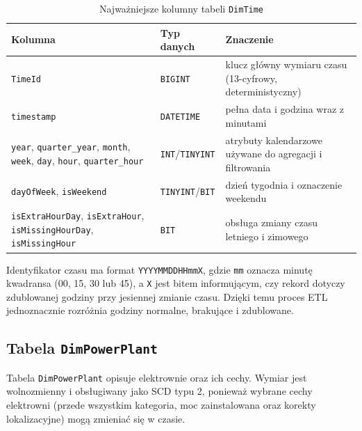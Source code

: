 \documentclass[12pt]{article}
\begin{document}
	\begin{table}[h!]
		\centering
		\small
		\begin{tabularx}{\textwidth}{|p{3.3cm}|p{2.6cm}|X|}
			\hline
			\textbf{Kolumna} & \textbf{Typ danych} & \textbf{Znaczenie} \\
			\hline
			\texttt{TimeId} & \texttt{BIGINT} & klucz główny wymiaru czasu (13-cyfrowy, deterministyczny) \\
			\hline
			\texttt{timestamp} & \texttt{DATETIME} & pełna data i godzina wraz z minutami \\
			\hline
			\texttt{year}, \texttt{quarter\_year}, \texttt{month}, \texttt{week}, \texttt{day}, \texttt{hour}, \texttt{quarter\_hour} & \texttt{INT}/\texttt{TINYINT} & atrybuty kalendarzowe używane do agregacji i filtrowania \\
			\hline
			\texttt{dayOfWeek}, \texttt{isWeekend} & \texttt{TINYINT}/\texttt{BIT} & dzień tygodnia i oznaczenie weekendu \\
			\hline
			\texttt{isExtraHourDay}, \texttt{isExtraHour}, \texttt{isMissingHourDay}, \texttt{isMissingHour} & \texttt{BIT} & obsługa zmiany czasu letniego i zimowego \\
			\hline
		\end{tabularx}
		\caption{Najważniejsze kolumny tabeli \texttt{DimTime}}
	\end{table}

	\noindent Identyfikator czasu ma format \texttt{YYYYMMDDHHmmX}, gdzie \texttt{mm} oznacza minutę kwadransa (00, 15, 30 lub 45), a \texttt{X} jest bitem informującym, czy rekord dotyczy zdublowanej godziny przy jesiennej zmianie czasu. Dzięki temu proces ETL jednoznacznie rozróżnia godziny normalne, brakujące i zdublowane.

	\subsection{Tabela \texttt{DimPowerPlant}}

	Tabela \texttt{DimPowerPlant} opisuje elektrownie oraz ich cechy. Wymiar jest wolnozmienny i obsługiwany jako SCD typu 2, ponieważ wybrane cechy elektrowni (przede wszystkim kategoria, moc zainstalowana oraz korekty lokalizacyjne) mogą zmieniać się w czasie.
\end{document}
